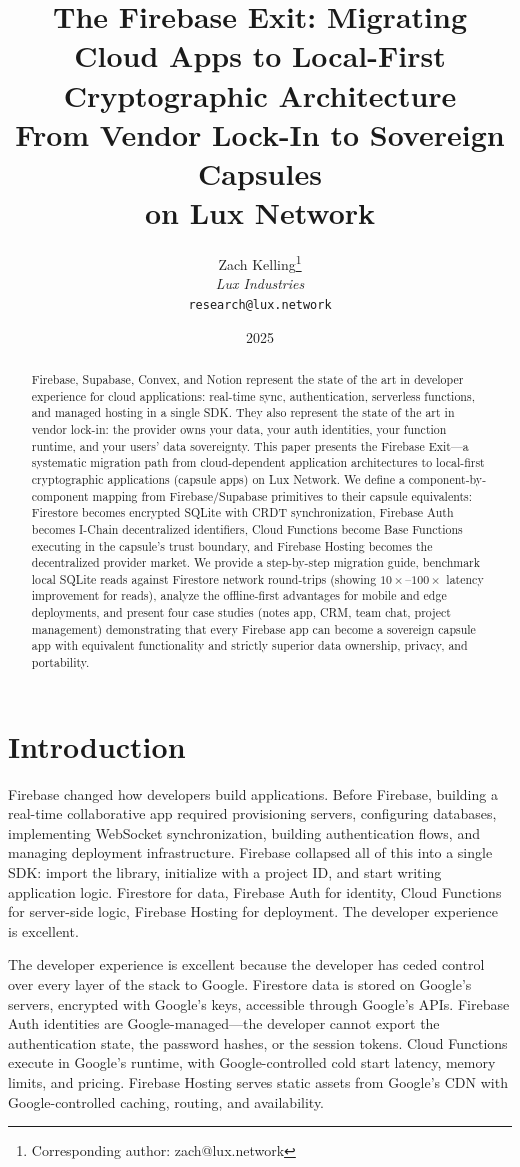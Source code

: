\documentclass[11pt,a4paper]{article}
\title{\textbf{The Firebase Exit: Migrating Cloud Apps to Local-First Cryptographic Architecture}\\[6pt]
\large From Vendor Lock-In to Sovereign Capsules\\on Lux Network}
\author{
Zach Kelling\thanks{Corresponding author: zach@lux.network}\\
\textit{Lux Industries}\\
\texttt{research@lux.network}
}
\date{2025}
\begin{document}
\luxcoverpage

\begin{abstract}
Firebase, Supabase, Convex, and Notion represent the state of the art in
developer experience for cloud applications: real-time sync, authentication,
serverless functions, and managed hosting in a single SDK. They also
represent the state of the art in vendor lock-in: the provider owns your
data, your auth identities, your function runtime, and your users' data
sovereignty. This paper presents the Firebase Exit---a systematic migration
path from cloud-dependent application architectures to local-first
cryptographic applications (capsule apps) on Lux Network. We define a
component-by-component mapping from Firebase/Supabase primitives to their
capsule equivalents: Firestore becomes encrypted SQLite with CRDT
synchronization, Firebase Auth becomes I-Chain decentralized identifiers,
Cloud Functions become Base Functions executing in the capsule's trust
boundary, and Firebase Hosting becomes the decentralized provider market.
We provide a step-by-step migration guide, benchmark local SQLite reads
against Firestore network round-trips (showing $10\times$--$100\times$
latency improvement for reads), analyze the offline-first advantages for
mobile and edge deployments, and present four case studies (notes app, CRM,
team chat, project management) demonstrating that every Firebase app can
become a sovereign capsule app with equivalent functionality and strictly
superior data ownership, privacy, and portability.
\end{abstract}

\section{Introduction}\label{sec:intro}

Firebase changed how developers build applications. Before Firebase, building
a real-time collaborative app required provisioning servers, configuring
databases, implementing WebSocket synchronization, building authentication
flows, and managing deployment infrastructure. Firebase collapsed all of
this into a single SDK: import the library, initialize with a project ID,
and start writing application logic. Firestore for data, Firebase Auth for
identity, Cloud Functions for server-side logic, Firebase Hosting for
deployment. The developer experience is excellent.

The developer experience is excellent because the developer has ceded
control over every layer of the stack to Google. Firestore data is stored
on Google's servers, encrypted with Google's keys, accessible through
Google's APIs. Firebase Auth identities are Google-managed---the developer
cannot export the authentication state, the password hashes, or the session
tokens. Cloud Functions execute in Google's runtime, with Google-controlled
cold start latency, memory limits, and pricing. Firebase Hosting serves
static assets from Google's CDN with Google-controlled caching, routing,
and availability.
\end{document}
